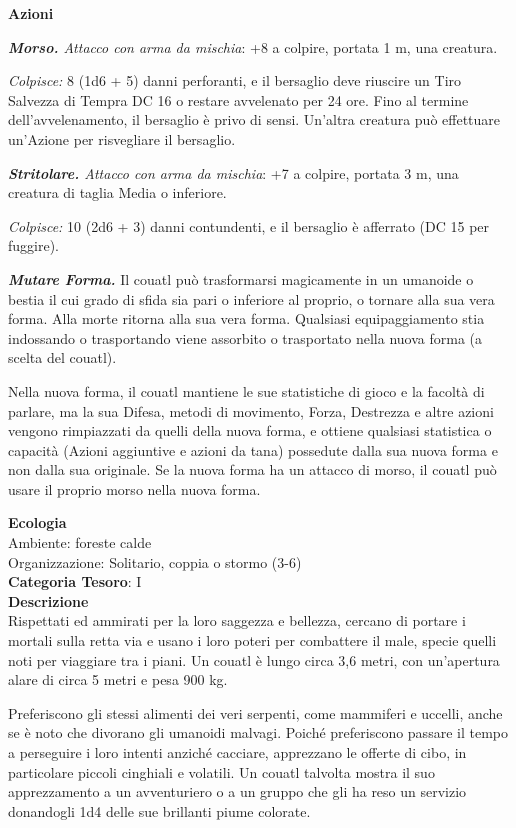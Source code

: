 \begin{multicols}{2}
{\textbf{Azioni}

\emph{\textbf{Morso.} Attacco con arma da mischia}: +8 a colpire, portata 1 m, una creatura.

\emph{Colpisce:} 8 (1d6 + 5) danni perforanti, e il bersaglio deve riuscire un Tiro Salvezza di Tempra DC 16 o restare avvelenato per 24 ore. Fino al termine dell'avvelenamento, il bersaglio è privo di sensi. Un'altra creatura può effettuare un'Azione per risvegliare il bersaglio.

\emph{\textbf{Stritolare.} Attacco con arma da mischia}: +7 a colpire, portata 3 m, una creatura di taglia Media o inferiore.

\emph{Colpisce:} 10 (2d6 + 3) danni contundenti, e il bersaglio è afferrato (DC 15 per fuggire).

\emph{\textbf{Mutare Forma.}} Il couatl può trasformarsi magicamente in un umanoide o bestia il cui grado di sfida sia pari o inferiore al proprio, o tornare alla sua vera forma. Alla morte ritorna alla sua vera forma. Qualsiasi equipaggiamento stia indossando o trasportando viene assorbito o trasportato nella nuova forma (a scelta del couatl).

Nella nuova forma, il couatl mantiene le sue statistiche di gioco e la facoltà di parlare, ma la sua Difesa, metodi di movimento, Forza, Destrezza e altre azioni vengono rimpiazzati da quelli della nuova forma, e ottiene qualsiasi statistica o capacità (Azioni aggiuntive e azioni da tana) possedute dalla sua nuova forma e non dalla sua originale. Se la nuova forma ha un attacco di morso, il couatl può usare il proprio morso nella nuova forma.

\textbf{Ecologia}\\
Ambiente: foreste calde\\
Organizzazione: Solitario, coppia o stormo (3-6)\\
\textbf{Categoria Tesoro}: I\\
\textbf{Descrizione}\\
Rispettati ed ammirati per la loro saggezza e bellezza, cercano di portare i mortali sulla retta via e usano i loro poteri per combattere il male, specie quelli noti per viaggiare tra i piani. Un couatl è lungo circa 3,6 metri, con un'apertura alare di circa 5 metri e pesa 900 kg.

Preferiscono gli stessi alimenti dei veri serpenti, come mammiferi e uccelli, anche se è noto che divorano gli umanoidi malvagi. Poiché preferiscono passare il tempo a perseguire i loro intenti anziché cacciare, apprezzano le offerte di cibo, in particolare piccoli cinghiali e volatili. Un couatl talvolta mostra il suo apprezzamento a un avventuriero o a un gruppo che gli ha reso un servizio donandogli 1d4 delle sue brillanti piume colorate.

}
\end{multicols}
